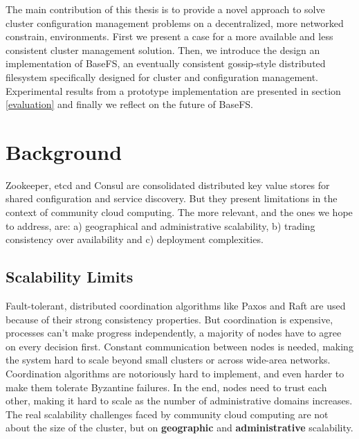 \documentclass{sig-alternate}
\begin{document}
The main contribution of this thesis is to provide a novel approach to solve cluster configuration management problems on a decentralized, more networked constrain, environments. First we present a case for a more available and less consistent cluster management solution. Then, we introduce the design an implementation of BaseFS, an eventually consistent gossip-style distributed filesystem specifically designed for cluster and configuration management. Experimental results from a prototype implementation are presented in section \ref{evaluation}  and finally we reflect on the future of BaseFS.

\section{Background}

Zookeeper, etcd and Consul are consolidated distributed key value stores for shared configuration and service discovery. But they present limitations in the context of community cloud computing. The more relevant, and the ones we hope to address, are: a) geographical and administrative scalability, b) trading consistency over availability and c) deployment complexities.

\subsection{Scalability Limits}

Fault-tolerant, distributed coordination algorithms like Paxos and Raft are used because of their strong consistency properties. But coordination is expensive, processes can't make progress independently, a majority of nodes have to agree on every decision first. Constant communication between nodes is needed, making the system hard to scale beyond small clusters or across wide-area networks. 
Coordination algorithms are notoriously hard to implement, and even harder to make them tolerate Byzantine failures. In the end, nodes need to trust each other, making it hard to scale as the number of administrative domains increases. 
The real scalability challenges faced by community cloud computing are not about the size of the cluster, but on \textbf{geographic} and \textbf{administrative} scalability.
\end{document}
